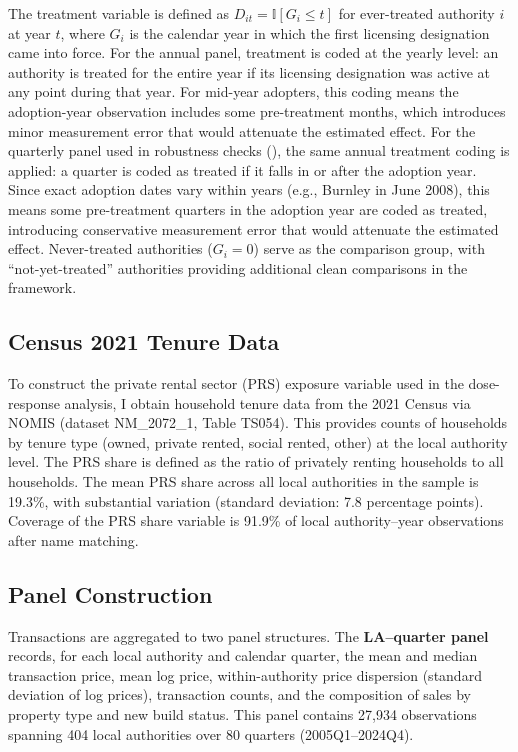 \documentclass[12pt]{article}
\newcommand{\ind}{\mathbb{I}}
\begin{document}
The treatment variable is defined as $D_{it} = \ind[G_i \leq t]$ for ever-treated authority $i$ at year $t$, where $G_i$ is the calendar year in which the first licensing designation came into force. For the annual panel, treatment is coded at the yearly level: an authority is treated for the entire year if its licensing designation was active at any point during that year. For mid-year adopters, this coding means the adoption-year observation includes some pre-treatment months, which introduces minor measurement error that would attenuate the estimated effect. For the quarterly panel used in robustness checks (), the same annual treatment coding is applied: a quarter is coded as treated if it falls in or after the adoption year. Since exact adoption dates vary within years (e.g., Burnley in June 2008), this means some pre-treatment quarters in the adoption year are coded as treated, introducing conservative measurement error that would attenuate the estimated effect. Never-treated authorities ($G_i = 0$) serve as the comparison group, with ``not-yet-treated'' authorities providing additional clean comparisons in the \citet{callaway2021difference} framework.

\subsection{Census 2021 Tenure Data}

To construct the private rental sector (PRS) exposure variable used in the dose-response analysis, I obtain household tenure data from the 2021 Census via NOMIS (dataset NM\_2072\_1, Table TS054). This provides counts of households by tenure type (owned, private rented, social rented, other) at the local authority level. The PRS share is defined as the ratio of privately renting households to all households. The mean PRS share across all local authorities in the sample is 19.3\%, with substantial variation (standard deviation: 7.8 percentage points). Coverage of the PRS share variable is 91.9\% of local authority--year observations after name matching.

\subsection{Panel Construction}

Transactions are aggregated to two panel structures. The \textbf{LA--quarter panel} records, for each local authority and calendar quarter, the mean and median transaction price, mean log price, within-authority price dispersion (standard deviation of log prices), transaction counts, and the composition of sales by property type and new build status. This panel contains 27,934 observations spanning 404 local authorities over 80 quarters (2005Q1--2024Q4).
\end{document}
